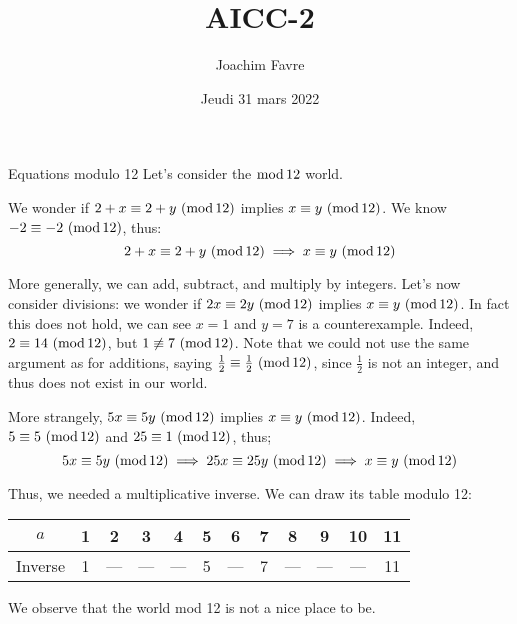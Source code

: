 \documentclass[a4paper]{article}
\title{AICC-2}
\author{Joachim Favre}
\date{Jeudi 31 mars 2022}
\begin{document}
\maketitle



\begin{parag}{Equations modulo 12}
    Let's consider the $\operatorname{mod} 12$ world.

    We wonder if $2+x \equiv 2 + y\ (\operatorname{mod} 12)$ implies $x \equiv y\ (\operatorname{mod} 12)$. We know $-2 \equiv -2\ (\operatorname{mod} 12)$, thus: 
    \[2+x \equiv 2 + y\ (\operatorname{mod} 12) \implies x \equiv y\ (\operatorname{mod} 12)\]
    
    More generally, we can add, subtract, and multiply by integers. Let's now consider divisions: we wonder if $2x \equiv 2y\ (\operatorname{mod} 12)$ implies $x \equiv y\ (\operatorname{mod} 12)$. In fact this does not hold, we can see $x = 1$ and $y = 7$ is a counterexample. Indeed, $2 \equiv 14\ (\operatorname{mod} 12)$, but $1 \not\equiv 7\ (\operatorname{mod} 12)$. Note that we could not use the same argument as for additions, saying $\frac{1}{2} \equiv \frac{1}{2}\ (\operatorname{mod} 12)$, since $\frac{1}{2}$ is not an integer, and thus does not exist in our world.

    More strangely, $5x \equiv 5y\ (\operatorname{mod} 12)$ implies $x \equiv y\ (\operatorname{mod} 12)$. Indeed, $5 \equiv 5\ (\operatorname{mod} 12)$ and $25 \equiv 1\ (\operatorname{mod} 12)$, thus; 
    \[5x \equiv 5y\ (\operatorname{mod} 12) \implies 25x \equiv 25y\ (\operatorname{mod} 12) \implies x \equiv y\ (\operatorname{mod} 12)\]

    Thus, we needed a multiplicative inverse. We can draw its table modulo 12:
    \begin{center}
    \begin{tabular}{c|ccccccccccc}
        $a$ & 1 & 2 & 3 & 4 & 5 & 6 & 7 & 8 & 9 & 10 & 11 \\
        \hline
        Inverse & 1 & --- & --- & --- & 5 & --- & 7 & --- & --- & --- & 11
    \end{tabular}
    \end{center}
    
    We observe that the world mod 12 is not a nice place to be.
\end{parag}
\end{document}
